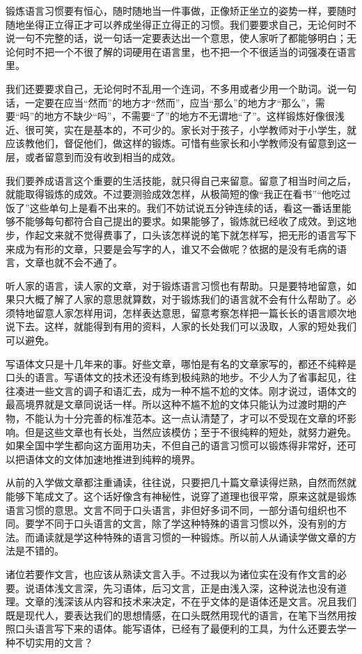 \documentclass[fontset=fandol,12pt,a5paper]{ctexbook}
\begin{document}
锻炼语言习惯要有恒心，随时随地当一件事做，正像矫正坐立的姿势一样，要随时随地坐得正立得正才可以养成坐得正立得正的习惯。我们要要求自己，无论何时不说一句不完整的话，说一句话一定要表达出一个意思，使人家听了都能够明白；无论何时不把一个不很了解的词硬用在语言里，也不把一个不很适当的词强凑在语言里。

我们还要要求自己，无论何时不乱用一个连词，不多用或者少用一个助词。说一句话，一定要在应当“然而”的地方才“然而”，应当“那么”的地方才“那么”，需要“吗”的地方不缺少“吗”，不需要“了”的地方不无谓地“了”。这样锻炼好像很浅近、很可笑，实在是基本的，不可少的。家长对于孩子，小学教师对于小学生，就应该教他们，督促他们，做这样的锻炼。可惜有些家长和小学教师没有留意到这一层，或者留意到而没有收到相当的成效。

我们要养成语言这个重要的生活技能，就只得自己来留意。留意了相当时间之后，就能取得锻炼的成效。不过要测验成效怎样，从极简短的像“我正在看书”“他吃过饭了”这些单句上是看不出来的。我们不妨试说五分钟连续的话，看这一番话里能够不能够每句都符合自己提出的要求。如果能够了，锻炼就已经收了成效。到这地步，作起文来就不觉得费事了，口头该怎样说的笔下就怎样写，把无形的语言写下来成为有形的文章，只要是会写字的人，谁又不会做呢？依据的是没有毛病的语言，文章也就不会不通了。

听人家的语言，读人家的文章，对于锻炼语言习惯也有帮助。只是要特地留意，如果只大概了解了人家的意思就算数，对于锻炼我们的语言就不会有什么帮助了。必须特地留意人家怎样用词，怎样表达意思，留意考察怎样把一篇长长的语言顺次地说下去。这样，就能得到有用的资料，人家的长处我们可以汲取，人家的短处我们可以避免。

写语体文只是十几年来的事。好些文章，哪怕是有名的文章家写的，都还不纯粹是口头的语言。写语体文的技术还没有练到极纯熟的地步。不少人为了省事起见，往往凑进一些文言的调子和语汇去，成为一种不尴不尬的文体。刚才说过，语体文的最高境界就是文章同说话一样。所以这种不尴不尬的文体只能认为过渡时期的产物，不能认为十分完善的标准范本。这一点认清楚了，才可以不受现在文章的坏影响。但是这些文章也有长处，当然应该模仿；至于不很纯粹的短处，就努力避免。如果全国中学生都向这方面用功夫，不但自己的语言习惯可以锻炼得非常好，还可以把语体文的文体加速地推进到纯粹的境界。

从前的入学做文章都注重诵读，往往说，只要把几十篇文章读得烂熟，自然而然就能够下笔成文了。这个话好像含有神秘性，说穿了道理也很平常，原来这就是锻炼语言习惯的意思。文言不同于口头语言，非但好多词不同，一部分语句组织也不同。要学不同于口头语言的文言，除了学这种特殊的语言习惯以外，没有别的方法。而诵读就是学这种特殊的语言习惯的一种锻炼。所以前人从诵读学做文章的方法是不错的。

诸位若要作文言，也应该从熟读文言入手。不过我以为诸位实在没有作文言的必要。说语体浅文言深，先习语体，后习文言，正是由浅入深，这种说法也没有道理。文章的浅深该从内容和技术来决定，不在乎文体的是语体还是文言。况且我们既是现代人，要表达我们的思想情感，在口头既然用现代的语言，在笔下当然用按照口头语言写下来的语体。能写语体，已经有了最便利的工具，为什么还要去学一种不切实用的文言？
\end{document}
